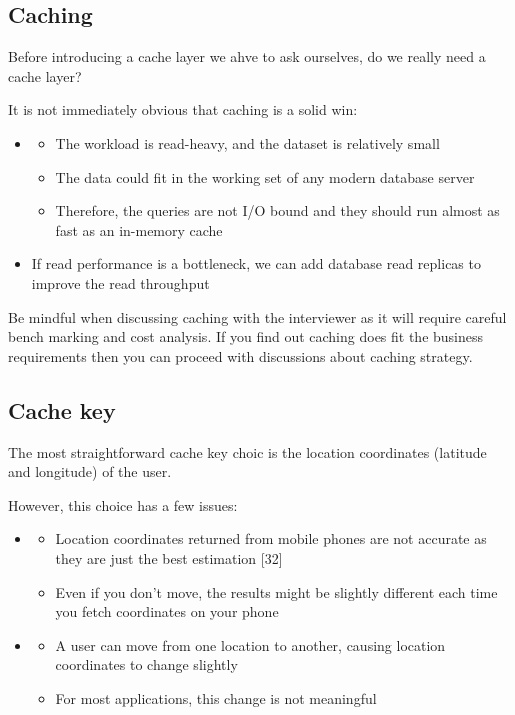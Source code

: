\documentclass{report}
\theoremstyle{definition}
\let\oldsubsection\subsection
\renewcommand{\subsection}{\oldsubsection*}
\begin{document}
\subsection{Caching}

Before introducing a cache layer we ahve to ask ourselves, do we really need a cache layer?

It is not immediately obvious that caching is a solid win:

\begin{itemize}
\item

\begin{itemize}
\item
The workload is read-heavy, and the dataset is relatively small
\item
The data could fit in the working set of any modern database server
\item
Therefore, the queries are not I/O bound and they should run almost as fast as an in-memory cache
\end{itemize}

\item
If read performance is a bottleneck, we can add database read replicas to improve the read throughput
\end{itemize}

Be mindful when discussing caching with the interviewer as it will require careful bench marking and cost analysis. If you find out
caching does fit the business requirements then you can proceed with discussions about caching strategy.

\subsection{Cache key}

The most straightforward cache key choic is the location coordinates (latitude and longitude) of the user.

However, this choice has a few issues:

\begin{itemize}
\item
\begin{itemize}
\item
Location coordinates returned from mobile phones are not accurate as they are just the best estimation [32]
\item
Even if you don't move, the results might be slightly different each time you fetch coordinates on your phone
\end{itemize}

\item
\begin{itemize}
\item
A user can move from one location to another, causing location coordinates to change slightly
\item
For most applications, this change is not meaningful
\end{itemize}
\end{itemize}
\end{document}
